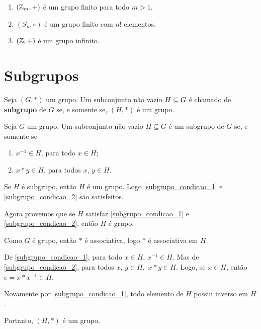 \begin{exemplos}
	\begin{enumerate}[label={\arabic*})]
		\item $(\mathbb{Z}_m, +)$ {\'e} um grupo finito para todo $m>1$.
		\item $(S_n, \circ)$ \'e um grupo finito com $n!$ elementos.
		\item $(\mathbb{Z}, +)$ {\'e} um grupo infinito.
	\end{enumerate}	
\end{exemplos}

\section{Subgrupos} %
\label{sec:subgrupos}

\begin{definicao}
	Seja $(G,*)$ um grupo. Um subconjunto n{\~a}o vazio $H\subseteq G$ {\'e} chamado de \textbf{subgrupo} de $G$ se, e somente se, $(H,*)$ {\'e} um grupo.
\end{definicao}

\begin{proposicao}
	Seja $G$ um grupo. Um subconjunto n{\~a}o vazio $H\subseteq G$ {\'e} um subgrupo de $G$ se, e somente se
	\begin{enumerate}[label={\roman*})]
		\item\label{subgrupo_condicao_1} $x^{-1}\in H$, para todo $x \in H$;
		\item\label{subgrupo_condicao_2} $x*y\in H$, para todos $x$, $y \in H$.
	\end{enumerate}
\end{proposicao}
\begin{prova}
	Se $H$ {\'e} subgrupo, ent{\~a}o $H$ {\'e} um grupo. Logo \ref{subgrupo_condicao_1} e \ref{subgrupo_condicao_2} s{\~a}o satisfeitos.

	Agora provemos que se $H$ satisfaz \ref{subgrupo_condicao_1} e \ref{subgrupo_condicao_2}, ent{\~a}o $H$ {\'e} grupo.

	Como $G$ {\'e} grupo, ent{\~a}o $*$ {\'e} associativa, logo $*$ {\'e} associativa em $H$.

	De \ref{subgrupo_condicao_1}, para todo $x \in H$, $x^{-1}\in H$. Mas de \ref{subgrupo_condicao_2}, para todos $x$, $y \in H,$ $x*y \in H$. Logo, se $x\in H$, ent{\~a}o $e = x*x^{-1} \in H$.

	Novamente por \ref{subgrupo_condicao_1}, todo elemento de $H$ possui inverso em $H$.

	Portanto, $(H,*)$ {\'e} um grupo.
\end{prova}


